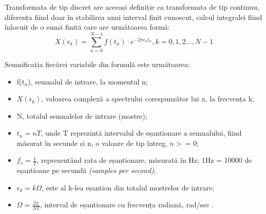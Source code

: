 \documentclass[a4paper,12pt]{report}
\begin{document}
Transformata de tip discret are aceeași definiție ca transformata de tip continuu, 
diferența fiind doar în stabilirea unui interval finit cunoscut, calcul integralei 
fiind înlocuit de o sumă finită care are următoarea formă:
\begin{equation*}
    X({\epsilon}_k) = \sum_{n=0}^{N-1} f(t_n) \cdot e ^ {-2 {\pi}{\epsilon}_k t_n } , k = 0,1,2...,N-1
\end{equation*}

Semnificația fiecărei variabile din formulă este următoarea:
\begin{itemize} 
    \setlength\itemsep{0.2em}
    \item f($t_n$), semnalul de intrare, la momentul n;
    \item $X(\epsilon_k)$, valoarea complexă a spectrului corespunzător lui x, la frecvența k;
    \item N, totalul semnalelor de intrare (mostre);
    \item $t_n = nT$, unde T reprezintă intervalul de eșantionare a semnalului, fiind măsurat în 
    secunde și n, o valoare de tip întreg, $n>=0$;
    \item $f_s = \frac{1}{T}$, reprezentând rata de eșantionare, măsurată în Hz; 1Hz = 10000 de 
    eșantioane pe secundă \emph{(samples per second)};
    \item $\epsilon_k = k\Omega$, este al k-lea eșantion din totalul mostrelor de intrare;
    \item $\Omega = \frac{2{\pi}}{NT}$, interval de eșantionare cu frecvența radiană, rad/sec \cite{Bonvini-Recognition}.
\end{itemize}
\end{document}
